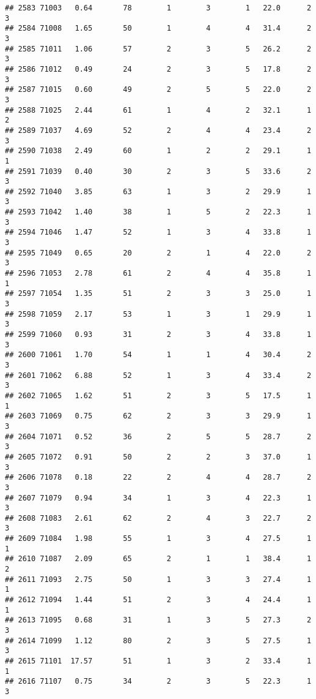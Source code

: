 \documentclass[
]{article}
\begin{document}
\begin{verbatim}
## 2583 71003   0.64       78        1        3        1   22.0      2      3
## 2584 71008   1.65       50        1        4        4   31.4      2      3
## 2585 71011   1.06       57        2        3        5   26.2      2      3
## 2586 71012   0.49       24        2        3        5   17.8      2      3
## 2587 71015   0.60       49        2        5        5   22.0      2      3
## 2588 71025   2.44       61        1        4        2   32.1      1      2
## 2589 71037   4.69       52        2        4        4   23.4      2      3
## 2590 71038   2.49       60        1        2        2   29.1      1      1
## 2591 71039   0.40       30        2        3        5   33.6      2      3
## 2592 71040   3.85       63        1        3        2   29.9      1      3
## 2593 71042   1.40       38        1        5        2   22.3      1      3
## 2594 71046   1.47       52        1        3        4   33.8      1      3
## 2595 71049   0.65       20        2        1        4   22.0      2      3
## 2596 71053   2.78       61        2        4        4   35.8      1      1
## 2597 71054   1.35       51        2        3        3   25.0      1      3
## 2598 71059   2.17       53        1        3        1   29.9      1      3
## 2599 71060   0.93       31        2        3        4   33.8      1      3
## 2600 71061   1.70       54        1        1        4   30.4      2      3
## 2601 71062   6.88       52        1        3        4   33.4      2      3
## 2602 71065   1.62       51        2        3        5   17.5      1      1
## 2603 71069   0.75       62        2        3        3   29.9      1      3
## 2604 71071   0.52       36        2        5        5   28.7      2      3
## 2605 71072   0.91       50        2        2        3   37.0      1      3
## 2606 71078   0.18       22        2        4        4   28.7      2      3
## 2607 71079   0.94       34        1        3        4   22.3      1      3
## 2608 71083   2.61       62        2        4        3   22.7      2      3
## 2609 71084   1.98       55        1        3        4   27.5      1      1
## 2610 71087   2.09       65        2        1        1   38.4      1      2
## 2611 71093   2.75       50        1        3        3   27.4      1      1
## 2612 71094   1.44       51        2        3        4   24.4      1      1
## 2613 71095   0.68       31        1        3        5   27.3      2      3
## 2614 71099   1.12       80        2        3        5   27.5      1      3
## 2615 71101  17.57       51        1        3        2   33.4      1      1
## 2616 71107   0.75       34        2        3        5   22.3      1      3

\end{verbatim}
\end{document}
